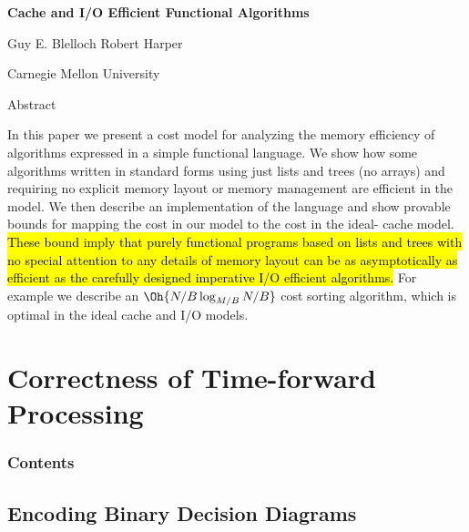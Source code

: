 \documentclass[english, aspectratio=169]{beamer}
\makeatletter
\let\HL\hl
\renewcommand\hl{%
  \let\set@color\beamerorig@set@color
  \let\reset@color\beamerorig@reset@color
  \HL}
\makeatother
\begin{document}
\begin{frame}
  \begin{center}
    {\Large\bf Cache and I/O Efficient Functional Algorithms}

    Guy E. Blelloch \qquad Robert Harper

    {\footnotesize Carnegie Mellon University}
  \end{center}

  \begin{block}{Abstract}
    \justifying \fontsize{8}{9}\selectfont

    In this paper we present a cost model for analyzing the memory efficiency of algorithms
    expressed in a simple functional language. We show how some algorithms written in standard forms
    using just lists and trees (no arrays) and requiring no explicit memory layout or memory
    management are efficient in the model. We then describe an implementation of the language and
    show provable bounds for mapping the cost in our model to the cost in the ideal- cache model.
    \hl{These bound imply that purely functional programs based on lists
      and trees with no special attention to any details of memory layout can be as asymptotically
      as efficient as the carefully designed imperative I/O efficient algorithms.} For example we
    describe an $\Oh{N/B \log_{M/B} N/B}$ cost sorting algorithm, which is optimal in the ideal
    cache and I/O models.
  \end{block}
\end{frame}

\blankframe

\section{Correctness of Time-forward Processing}

\begin{frame}{}
  \frametitle{Contents}
  \tableofcontents
\end{frame}

\subsection{Encoding Binary Decision Diagrams}
\end{document}
